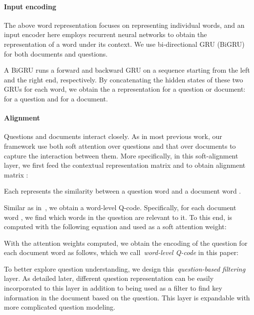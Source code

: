 \documentclass{article}
\begin{document}
\paragraph{Input encoding}
The above word representation focuses on representing individual words, and an input encoder here employs recurrent neural networks to obtain the representation of a word under its context. We use bi-directional GRU (BiGRU)~\citep{cho2014properties} for both  documents and questions. 

\vspace{-2mm}
{\fontsize{10pt}{1.0cm}
 	
}
\vspace{-6mm}


A BiGRU runs a forward and backward GRU on a sequence starting from the left and the right end, respectively. By concatenating the hidden states of these two GRUs for each word, we obtain the a representation for a question or document:  for a question and  for a document.

\paragraph{Alignment}
Questions and documents interact closely. As in most previous work, our framework use both soft attention over questions and that over documents to capture the interaction between them. More specifically, in this soft-alignment layer, we first feed the contextual representation matrix  and  to obtain alignment matrix :

Each  represents the similarity between a question word  and a document word . 


\textit{\underline{}}
Similar as in~\citep{seo2016bidirectional}, we obtain a word-level Q-code. Specifically, for each document word , we find which words in the question are relevant to it. To this end,  is computed with the following equation and used as a soft attention weight:

With the attention weights computed, we obtain the encoding of the question for each document word  as follows, which we call~\textit{word-level Q-code} in this paper:


\textit{\underline{}} To better explore question understanding, we design this~\textit{question-based filtering} layer. As detailed later, different question representation can be easily incorporated to this layer in addition to being used as a filter to find key information in the document based on the question. This layer is  expandable with more complicated question modeling. 
\end{document}
